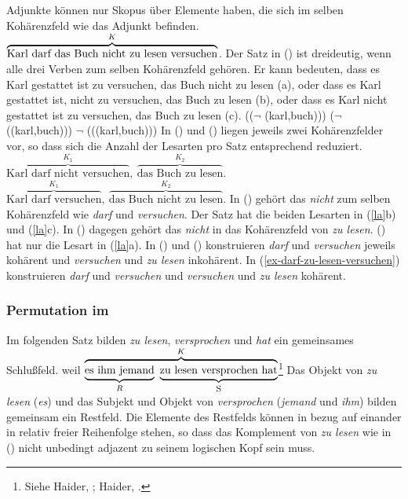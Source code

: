 Adjunkte können nur Skopus über Elemente haben, die sich im selben Kohärenzfeld
wie das Adjunkt befinden.
\ea
\label{ex-darf-zu-lesen-versuchen}
$\overbrace{ \mbox{Karl darf\iw{dürfen} das Buch nicht zu lesen versuchen} }^{K}$.
\z
Der Satz in () ist dreideutig, wenn alle drei Verben zum selben Kohärenzfeld
gehören. Er kann bedeuten, dass es Karl gestattet ist zu versuchen,
das Buch nicht zu lesen (a), oder dass es Karl gestattet ist, nicht zu versuchen, das Buch zu lesen (b),
oder dass es Karl nicht gestattet ist zu versuchen, das Buch zu lesen (c).
\eal
\label{la}
\ex {}(($\neg$ (karl,buch)))
\ex {}($\neg$ ((karl,buch)))
\ex $\neg$ (((karl,buch)))
\zl
In () und () liegen jeweils zwei Kohärenzfelder vor, so dass
sich die Anzahl der Lesarten pro Satz entsprechend reduziert.
\ea
$\overbrace{ \mbox{Karl darf nicht versuchen}}^{K_1},~\overbrace{\mbox{das Buch zu lesen}}^{K_2}$.
\z
\ea
$\overbrace{ \mbox{Karl darf versuchen}}^{K_1},~\overbrace{\mbox{das Buch nicht zu lesen}}^{K_2}$.
\z
In () gehört das \emph{nicht} zum selben Kohärenzfeld wie \emph{darf}
und \emph{versuchen}. Der Satz hat die beiden Lesarten in (\ref{la}b) und (\ref{la}c).
In () dagegen gehört das \emph{nicht} in das Kohärenzfeld
von \emph{zu lesen}. () hat nur die Lesart in (\ref{la}a). In () und ()
konstruieren \emph{darf} und \emph{versuchen} jeweils kohärent und \emph{versuchen} und \emph{zu
lesen} inkohärent. In (\ref{ex-darf-zu-lesen-versuchen}) konstruieren \emph{darf} und
\emph{versuchen} und \emph{versuchen} und \emph{zu lesen} kohärent.

\subsubsection{Permutation im \mf}

Im folgenden Satz bilden \emph{zu lesen}, \emph{versprochen} und \emph{hat}
ein gemeinsames Schlußfeld.
\ea
\label{zu-lesen-versp}
weil $\overbrace{ \underbrace{\rule[-0.5ex]{0cm}{2.5ex}\mbox{es ihm jemand} }_{R}~
                    \underbrace{\rule[-0.5ex]{0cm}{2.5ex}\mbox{zu lesen versprochen\iw{versprechen} hat}}_{\mbox{\footnotesize S}}
                  }^{K}$\footnote{
        Siehe Haider, \citeyear[]{Haider86c}; Haider, \citeyear[]{Haider90b}.
}
\z
Das Objekt von \emph{zu lesen} (\emph{es})
und das Subjekt und Objekt von \emph{versprochen} (\emph{jemand} und \emph{ihm})
bilden gemeinsam ein Restfeld. Die Elemente des Restfelds können in bezug
auf einander in relativ freier Reihenfolge stehen, so dass das Komplement von \emph{zu lesen}
wie in () nicht unbedingt adjazent zu seinem logischen Kopf sein muss.

